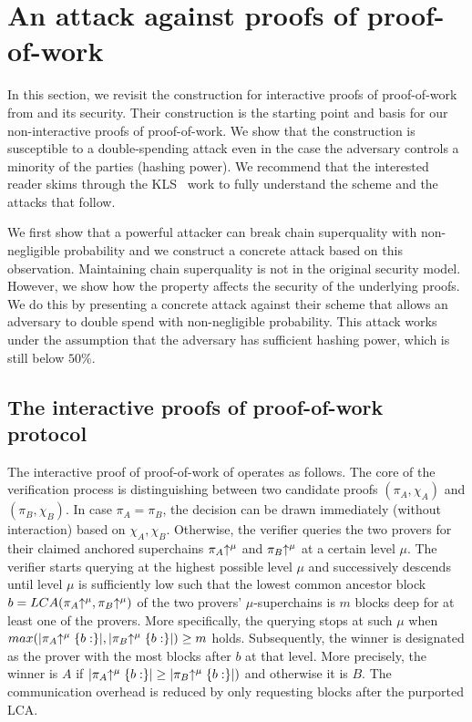 \section{An attack against proofs of proof-of-work}

In this section, we revisit the construction for interactive proofs of
proof-of-work from \cite{KLS} and its security.  Their
construction is the starting point and  basis for our
non-interactive proofs of proof-of-work. We show that the construction
is susceptible to  a double-spending attack even in the case the adversary
controls a minority of the parties (hashing power).  We recommend that the
interested reader skims through the KLS~\cite{KLS} work to fully understand the
scheme and the  attacks that follow.

We first show that a powerful attacker can break chain superquality with
non-negligible probability and we construct a concrete attack based on this
observation. Maintaining chain superquality is not in the original
security model. However, we show how the property affects the security  of the
underlying proofs. We do this by presenting a concrete attack against their
scheme that allows an adversary to double spend with non-negligible probability.
This attack works under the assumption that the adversary has sufficient hashing
power, which is still below $50\%$.

\subsection{The interactive proofs of proof-of-work protocol}


The interactive proof of
proof-of-work of \cite{KLS} operates as follows.
The core of the verification process is distinguishing between
two candidate proofs $(\pi_A, \chi_A)$  and $(\pi_B, \chi_B)$.
In case  $\pi_A  = \pi_B$, the decision can be drawn immediately (without interaction) based
on $\chi_A,\chi_B$.
Otherwise, the verifier queries the two provers for their claimed
anchored superchains $\pi_A\negthickspace\uparrow^\mu$ and $\pi_B\negthickspace\uparrow^\mu$ at a
certain level $\mu$. The verifier starts querying at the highest possible level
$\mu$ and successively descends until level $\mu$ is sufficiently low such that
the lowest common ancestor block $b = LCA(\pi_A\negthickspace\uparrow^\mu,
\pi_B\negthickspace\uparrow^\mu)$ of the two provers' $\mu$-superchains is $m$ blocks deep
for at least one of the provers. More specifically, the querying stops at such
$\mu$ when $max(|\pi_A\negthickspace\uparrow^\mu\{b:\}|, |\pi_B\negthickspace\uparrow^\mu\{b:\}|) \geq
m$ holds. Subsequently, the winner is designated as the prover with the most
blocks after $b$ at that level. More precisely, the winner is $A$ if
$|\pi_A\negthickspace\uparrow^\mu\{b:\}| \geq |\pi_B\negthickspace\uparrow^\mu\{b:\}|)$ and otherwise it
is $B$. The communication overhead is  reduced by only requesting
blocks after the purported LCA.

